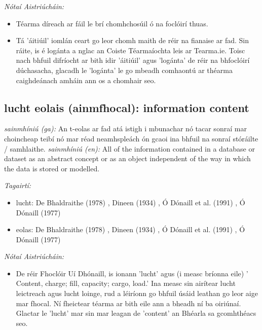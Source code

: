 \documentclass{article}
\begin{document}
 \noindent \textit{Nótaí Aistriúcháin:}
\begin{itemize}
	\item Téarma díreach ar fáil le brí chomhchosúil ó na foclóirí thuas.
	\item Tá 'áitiúil' iomlán ceart go leor chomh maith de réir na fianaise ar fad. Sin ráite, is é logánta a nglac an Coiste Téarmaíochta leis ar Tearma.ie. Toisc nach bhfuil difríocht ar bith idir 'áitiúil' agus 'logánta' de réir na bhfoclóirí dúchasacha, glacadh le 'logánta' le go mbeadh comhaontú ar théarma caighdeánach amháin ann os a chomhair seo.
\end{itemize}


\subsection*{lucht eolais (ainmfhocal): information content} 
 \noindent \textit{sainmhíniú (ga):} An t-eolas ar fad atá istigh i mbunachar nó tacar sonraí mar choincheap teibí nó mar réad neamhspleách ón gcaoi ina bhfuil na sonraí stóráilte / samhlaithe.
\newline\newline
 \noindent \textit{sainmhíniú (en):} All of the information contained in a database or dataset as an abstract concept or as an object independent of the way in which the data is stored or modelled.
\newline

 \noindent \textit{Tagairtí:}
\begin{itemize}
	\item lucht: De Bhaldraithe (1978) \cite{de-bhaldraithe}, Dineen (1934) \cite{dineen}, Ó Dónaill et al. (1991) \cite{focloir-beag}, Ó Dónaill (1977) \cite{odonaill}
	\item eolas: De Bhaldraithe (1978) \cite{de-bhaldraithe}, Dineen (1934) \cite{dineen}, Ó Dónaill et al. (1991) \cite{focloir-beag}, Ó Dónaill (1977) \cite{odonaill}
\end{itemize}

 \noindent \textit{Nótaí Aistriúcháin:}
\begin{itemize}
	\item De réir Fhoclóir Uí Dhónaill, is ionann 'lucht' agus (i measc bríonna eile) ' Content, charge; fill, capacity; cargo, load.' Ina measc sin airítear lucht leictreach agus lucht loinge, rud a léiríonn go bhfuil úsáid leathan go leor aige mar fhocal. Ní fheictear téarma ar bith eile ann a bheadh ní ba oiriúnaí. Glactar le 'lucht' mar sin mar leagan de 'content' an Bhéarla sa gcomhthéacs seo.
\end{itemize}
\end{document}
